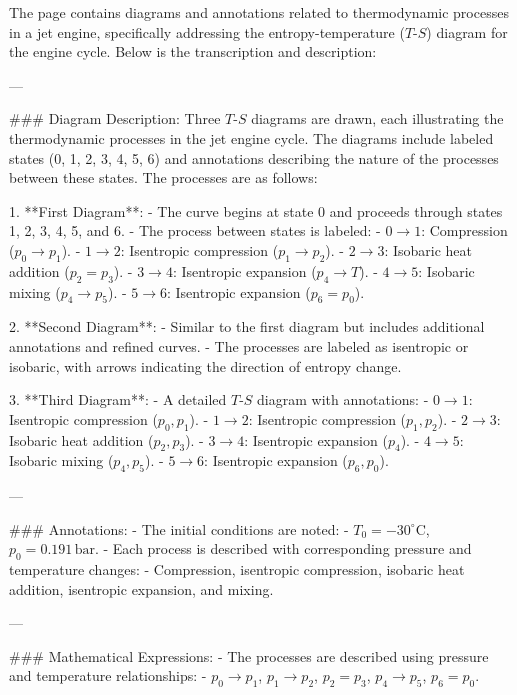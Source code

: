 The page contains diagrams and annotations related to thermodynamic processes in a jet engine, specifically addressing the entropy-temperature (\(T\)-\(S\)) diagram for the engine cycle. Below is the transcription and description:

---

### Diagram Description:
Three \(T\)-\(S\) diagrams are drawn, each illustrating the thermodynamic processes in the jet engine cycle. The diagrams include labeled states (0, 1, 2, 3, 4, 5, 6) and annotations describing the nature of the processes between these states. The processes are as follows:

1. **First Diagram**:
   - The curve begins at state 0 and proceeds through states 1, 2, 3, 4, 5, and 6.
   - The process between states is labeled:
     - \(0 \rightarrow 1\): Compression (\(p_0 \rightarrow p_1\)).
     - \(1 \rightarrow 2\): Isentropic compression (\(p_1 \rightarrow p_2\)).
     - \(2 \rightarrow 3\): Isobaric heat addition (\(p_2 = p_3\)).
     - \(3 \rightarrow 4\): Isentropic expansion (\(p_4 \rightarrow T\)).
     - \(4 \rightarrow 5\): Isobaric mixing (\(p_4 \rightarrow p_5\)).
     - \(5 \rightarrow 6\): Isentropic expansion (\(p_6 = p_0\)).

2. **Second Diagram**:
   - Similar to the first diagram but includes additional annotations and refined curves.
   - The processes are labeled as isentropic or isobaric, with arrows indicating the direction of entropy change.

3. **Third Diagram**:
   - A detailed \(T\)-\(S\) diagram with annotations:
     - \(0 \rightarrow 1\): Isentropic compression (\(p_0, p_1\)).
     - \(1 \rightarrow 2\): Isentropic compression (\(p_1, p_2\)).
     - \(2 \rightarrow 3\): Isobaric heat addition (\(p_2, p_3\)).
     - \(3 \rightarrow 4\): Isentropic expansion (\(p_4\)).
     - \(4 \rightarrow 5\): Isobaric mixing (\(p_4, p_5\)).
     - \(5 \rightarrow 6\): Isentropic expansion (\(p_6, p_0\)).

---

### Annotations:
- The initial conditions are noted:
  - \(T_0 = -30^\circ\text{C}\), \(p_0 = 0.191 \, \text{bar}\).
- Each process is described with corresponding pressure and temperature changes:
  - Compression, isentropic compression, isobaric heat addition, isentropic expansion, and mixing.

---

### Mathematical Expressions:
- The processes are described using pressure and temperature relationships:
  - \(p_0 \rightarrow p_1\), \(p_1 \rightarrow p_2\), \(p_2 = p_3\), \(p_4 \rightarrow p_5\), \(p_6 = p_0\).

